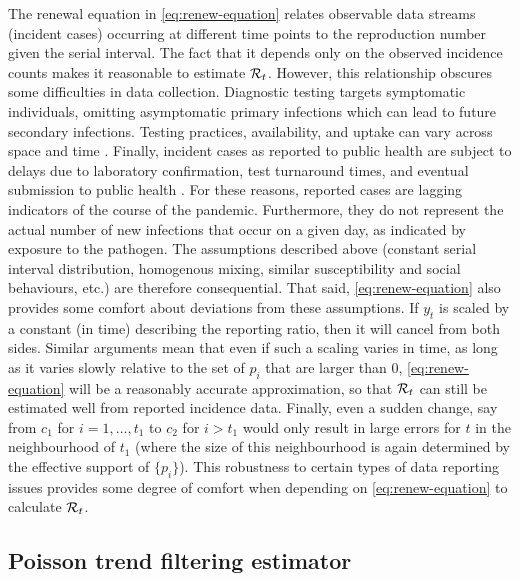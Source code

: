 The renewal equation in \eqref{eq:renew-equation} relates observable data
streams (incident cases) occurring at different time points to the reproduction
number given the serial interval. The fact that it depends only on the observed
incidence counts makes it reasonable to estimate $\mathcal{R}_t$. However, this
relationship obscures some difficulties in data collection. Diagnostic testing
targets symptomatic individuals, omitting asymptomatic primary infections which
can lead to future secondary infections. Testing practices, availability, and
uptake can vary across space and time \citep{pitzer2021impact,
hitchings2021usefulness}. Finally, incident cases as reported to public health
are subject to delays due to laboratory confirmation, test turnaround times, and
eventual submission to public health \citep{pellis2021challenges}. For these
reasons, reported cases are lagging indicators of the course of the pandemic.
Furthermore, they do not represent the actual number of new infections that
occur on a given day, as indicated by exposure to the pathogen. The assumptions
described above (constant serial interval distribution, homogenous mixing,
similar susceptibility and social behaviours, etc.) are therefore consequential.
That said, \eqref{eq:renew-equation} also provides some comfort about deviations
from these assumptions. If $y_t$ is scaled by a constant (in time) describing
the reporting ratio, then it will cancel from both sides. Similar arguments mean
that even if such a scaling varies in time, as long as it varies slowly relative
to the set of $p_i$ that are larger than 0, \eqref{eq:renew-equation} will be a
reasonably accurate approximation, so that $\mathcal{R}_t$ can still be estimated well
from reported incidence data. Finally, even a sudden change, say from $c_1$ for
$i=1,\ldots,t_1$ to $c_2$ for $i>t_1$ would only result in large errors for $t$
in the neighbourhood of $t_1$ (where the size of this neighbourhood is again
determined by the effective support of $\{p_i\}$). This robustness to certain
types of data reporting issues provides some degree of comfort when depending on
\eqref{eq:renew-equation} to calculate $\mathcal{R}_t$.

\subsection{Poisson trend filtering estimator} %

